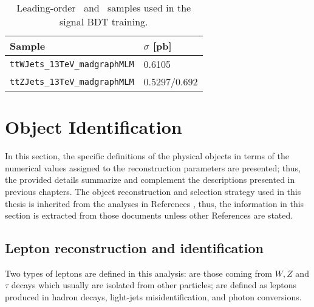 \begin{table}
\centering
\begin{tabular}{ll}
                          Sample & $\sigma$ [pb] \\\hline
\verb|ttWJets_13TeV_madgraphMLM| & 0.6105 \\
\verb|ttZJets_13TeV_madgraphMLM| & 0.5297/0.692 \\\hline
\end{tabular}
\caption[Leading-order \ttW\ and \ttZ\ samples used in the signal BDT training.]{Leading-order \ttW\ and \ttZ\ samples used in the signal BDT training.} \label{tab:ttvlo_samples}
\end{table}




































\section{Object Identification}\label{sec:ob_id}


In this section, the specific definitions of the physical objects in terms of the numerical values assigned to the reconstruction parameters are presented; thus, the provided details summarize and complement the descriptions presented in previous chapters. The object reconstruction and selection strategy used in this thesis is inherited from the analyses in References \cite{CMS_AN_2016-211,CMS_AN_2017-029}, thus, the information in this section is extracted from those documents unless other References are stated.

\subsection{Lepton reconstruction and identification}

Two types of leptons are defined in this analysis:  are those coming from $W, Z$ and $\tau$ decays which usually are isolated from other particles;  are defined as leptons produced in \bjet hadron decays, light-jets misidentification, and photon conversions. 

